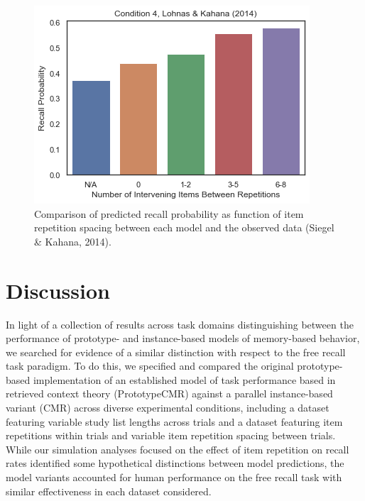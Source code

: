 \documentclass[
  letterpaper,
  DIV=11]{article}
\begin{document}
\begin{figure}
{\begin{minipage}[t]{0.33\linewidth}
{{\includegraphics{./figures/data_spacing.png}

}

}\end{minipage}%
}

\caption{\label{fig-lohnas_spacing}Comparison of predicted recall
probability as function of item repetition spacing between each model
and the observed data (Siegel \& Kahana, 2014).}

\end{figure}

\hypertarget{discussion}{%
\section{Discussion}\label{discussion}}

In light of a collection of results across task domains distinguishing
between the performance of prototype- and instance-based models of
memory-based behavior, we searched for evidence of a similar distinction
with respect to the free recall task paradigm. To do this, we specified
and compared the original prototype-based implementation of an
established model of task performance based in retrieved context theory
(PrototypeCMR) against a parallel instance-based variant (CMR) across
diverse experimental conditions, including a dataset featuring variable
study list lengths across trials and a dataset featuring item
repetitions within trials and variable item repetition spacing between
trials. While our simulation analyses focused on the effect of item
repetition on recall rates identified some hypothetical distinctions
between model predictions, the model variants accounted for human
performance on the free recall task with similar effectiveness in each
dataset considered.
\end{document}
